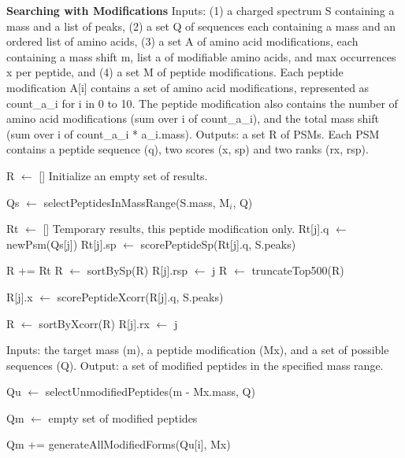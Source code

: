 \documentclass[12pt]{article}
\begin{document}
\begin{algorithm}
\caption{{\bf Searching with Modifications} Inputs: (1) a charged
  spectrum S containing a mass and a list of peaks, (2) a set Q of
  sequences each containing a mass and an ordered list of amino acids,
  (3) a set A of amino acid modifications, each containing a mass
  shift m, list a of modifiable amino acids, and max occurrences x per
  peptide, and (4) a set M of peptide modifications.  Each peptide
  modification A[i] contains a set of amino acid modifications,
  represented as count\_a\_i for i in 0 to 10.  The peptide
  modification also contains the number of amino acid modifications
  (sum over i of count\_a\_i), and the total mass shift (sum over i of
  count\_a\_i * a\_i.mass). Outputs: a set R of PSMs.  Each PSM
  contains a peptide sequence (q), two scores (x, sp) and two ranks
  (rx, rsp).}

\begin{algorithmic}[1]

\State R $\gets$ []
\Comment Initialize an empty set of results.

   \State Qs $\gets$ selectPeptidesInMassRange(S.mass, M$_i$, Q)

   \State Rt $\gets$ []
   \Comment Temporary results, this peptide modification only.
     \State Rt[j].q $\gets$ newPsm(Qs[j])
     \State Rt[j].sp $\gets$ scorePeptideSp(Rt[j].q, S.peaks)
   \EndFor

   \State R += Rt
   \State R $\gets$ sortBySp(R)
     \State R[j].rsp $\gets$ j
   \EndFor
   \State R $\gets$ truncateTop500(R)

     \State R[j].x $\gets$ scorePeptideXcorr(R[j].q, S.peaks)
   \EndFor

   \State R $\gets$ sortByXcorr(R)
     \State R[j].rx $\gets$ j
   \EndFor

\EndFor

\State {}
\EndProcedure
\end{algorithmic}
\end{algorithm}

\begin{algorithm}
\caption{ Inputs: the target mass (m), a peptide modification (Mx),
  and a set of possible sequences (Q).  Output: a set of modified
  peptides in the specified mass range.}

\begin{algorithmic}[1]
  \State Qu $\gets$ selectUnmodifiedPeptides(m - Mx.mass, Q)
   
  \State Qm $\gets$ empty set of modified peptides

      \State Qm += generateAllModifiedForms(Qu[i], Mx)
    \EndIf
  \EndFor

  \State {}
\EndProcedure
\end{algorithmic}
\end{algorithm}
\end{document}
